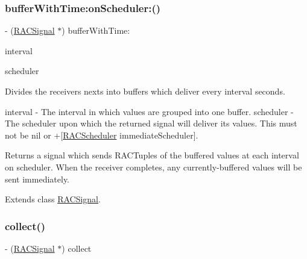\subsubsection{\texorpdfstring{buffer\+With\+Time\+:on\+Scheduler\+:()}{bufferWithTime:onScheduler:()}\hspace{0.1cm}{\footnotesize\ttfamily [3/3]}}
{\footnotesize\ttfamily -\/ (\mbox{\hyperlink{interface_r_a_c_signal}{R\+A\+C\+Signal}} $\ast$) buffer\+With\+Time\+: \begin{DoxyParamCaption}\item[{(N\+S\+Time\+Interval)}]{interval }\item[{onScheduler:(\mbox{\hyperlink{interface_r_a_c_scheduler}{R\+A\+C\+Scheduler}} $\ast$)}]{scheduler }\end{DoxyParamCaption}}

Divides the receiver\textquotesingle{}s {\ttfamily next}s into buffers which deliver every {\ttfamily interval} seconds.

interval -\/ The interval in which values are grouped into one buffer. scheduler -\/ The scheduler upon which the returned signal will deliver its values. This must not be nil or +\mbox{[}\mbox{\hyperlink{interface_r_a_c_scheduler}{R\+A\+C\+Scheduler}} immediate\+Scheduler\mbox{]}.

Returns a signal which sends R\+A\+C\+Tuples of the buffered values at each interval on {\ttfamily scheduler}. When the receiver completes, any currently-\/buffered values will be sent immediately. 

Extends class \mbox{\hyperlink{interface_r_a_c_signal_a7f0cb2086a2123f40552d2eab2a9cc54}{R\+A\+C\+Signal}}.

\mbox{\label{category_r_a_c_signal_07_operations_08_a70b8f976dc0ece9b82e47cdb346a3a09}} 
\subsubsection{\texorpdfstring{collect()}{collect()}\hspace{0.1cm}{\footnotesize\ttfamily [1/3]}}
{\footnotesize\ttfamily -\/ (\mbox{\hyperlink{interface_r_a_c_signal}{R\+A\+C\+Signal}} $\ast$) collect \begin{DoxyParamCaption}{ }\end{DoxyParamCaption}}

